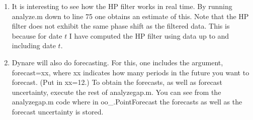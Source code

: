 \begin{enumerate}
\item It is interesting to see how the HP filter works in real time. By
running analyze.m down to line 75 one obtains an estimate of this. Note that
the HP filter does not exhibit the same phase shift as the filtered data.
This is because for date $t$ I have computed the HP filter using data up to
and including date $t.$

\item Dynare will also do forecasting. For this, one includes the argument,
forecast=xx, where xx indicates how many periods in the future you want to
forecast. (Put in xx=12.) To obtain the forecasts, as well as forecast
uncertainty, execute the rest of analyzegap.m. You can see from the
analyzegap.m code where in oo\_.PointForecast the forecasts as well as the
forecast uncertainty is stored.
\end{enumerate}


